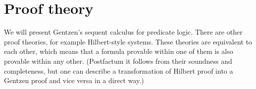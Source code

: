 \section{Proof theory}
We will present Gentzen's sequent calculus for predicate logic.
There are other proof theories, for example Hilbert-style systems.
These theories are equivalent to each other, which means that a formula provable within one of them is also provable within any other.
(Postfactum it follows from their soundness and completeness,
but one can describe a transformation of Hilbert proof into a Gentzen proof and vice versa in a direct way.)

